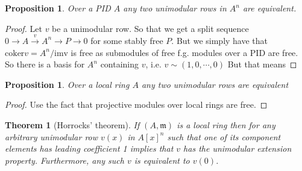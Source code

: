 \documentclass[12pt]{article}
\numberwithin{equation}{section}
\newcommand{\coker}{{\mathrm{coker}}}
\newcounter{dummy} \numberwithin{dummy}{section}
\newtheorem{theorem}[dummy]{Theorem}
\newtheorem{proposition}[dummy]{Proposition}
\begin{document}
	\begin{proposition}\label{inductionbaseforprequillensuslin}
		Over a PID $A$ any two unimodular rows in $A^n$ are equivalent.
	\end{proposition}
	\begin{proof}
		Let $v $ be a unimodular row. So that we get a split sequence $0 \to A \xrightarrow{v} A^n \to P \to 0 $ for some stably free $P$. But we simply have that $\coker v = A^n/\mathrm{im v} $ is free as submodules of free f.g. modules over a PID are free. So there is a basis for $A^n$ containing $v$, i.e. $v \sim (1,0,\cdots,0)$
	But that means 
	\end{proof}
	\begin{proposition}
		Over a local ring $A$ any two unimodular rows are equivalent
	\end{proposition}
	\begin{proof}
		Use the fact that projective modules over local rings are free.
	\end{proof}
	\begin{theorem}[Horrocks' theorem]
	If $(A, \mathfrak{m})$ is a local ring then for any arbitrary unimodular row $v(x)$ in $A[x]^n$ such that one of its component elements has leading coefficient 1 implies that $v$ has the unimodular extension property. Furthermore, any such $v$ is equivalent to $v(0)$.
	\end{theorem}
\end{document}
